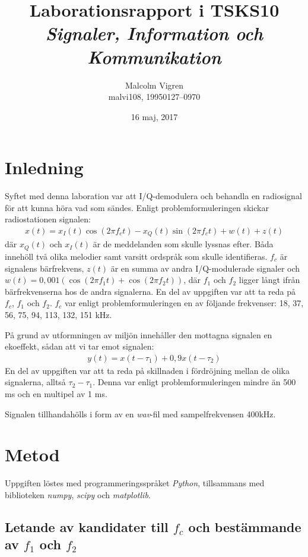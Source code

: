 \documentclass[10pt,twocolumn]{article}
\title{Laborationsrapport i TSKS10 \emph{Signaler, Information och Kommunikation}}
\author{Malcolm Vigren \\ malvi108, 19950127--0970 }
\date{16 maj, 2017}
\begin{document}
\maketitle

\section{Inledning}

Syftet med denna laboration var att I/Q-demodulera och behandla en radiosignal
för att kunna höra vad som sändes. Enligt problemformuleringen skickar
radiostationen signalen:
\begin{align*}
    x(t) = x_I(t)\cos(2 \pi f_c t) - x_Q(t)\sin(2 \pi f_c t) + w(t) + z(t)
\end{align*}
där $x_Q(t)$ och $x_I(t)$ är de meddelanden som skulle lyssnas efter. 
Båda innehöll två olika melodier samt varsitt ordspråk som skulle identifieras.
$f_c$ är signalens bärfrekvens, $z(t)$ är en summa av andra I/Q-modulerade
signaler och $w(t) = 0,001(\cos(2 \pi f_1 t) + \cos(2 \pi f_2 t))$, där $f_1$ och
$f_2$ ligger långt ifrån bärfrekvenserna hos de andra signalerna. En del av
uppgiften var att ta reda på $f_c$, $f_1$ och $f_2$. $f_c$ var enligt
problemformuleringen en av följande frekvenser: 18, 37, 56, 75, 94, 113,
132, 151 kHz.

På grund av utformningen av miljön innehåller den mottagna signalen en
ekoeffekt, sådan att vi tar emot signalen:
\begin{align*}
    y(t) = x(t - \tau_1) + 0,9x(t - \tau_2)
\end{align*}
En del av uppgiften var att ta reda på skillnaden i fördröjning mellan 
de olika signalerna,
alltså $\tau_2 - \tau_1$. Denna var enligt problemformuleringen mindre än 500 ms
och en multipel av 1 ms.

Signalen tillhandahölls i form av en \textit{wav}-fil med sampelfrekvensen 400kHz.

\section{Metod}

Uppgiften löstes med programmeringsspråket \textit{Python}, tillsammans med
biblioteken \textit{numpy}, \textit{scipy} och \textit{matplotlib}.

\subsection{Letande av kandidater till $f_c$ och bestämmande av $f_1$ och
$f_2$}\label{sub:candidates}
\end{document}
